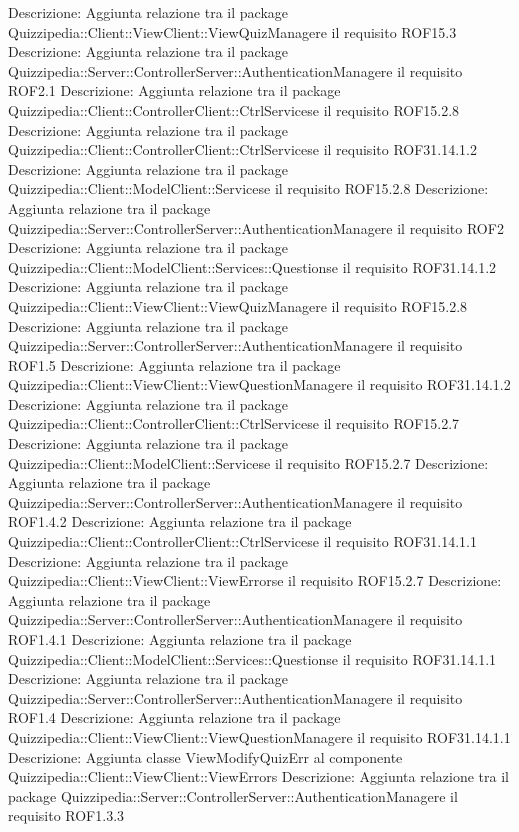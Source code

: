 Descrizione: Aggiunta relazione tra il package Quizzipedia::Client::ViewClient::ViewQuizManagere il requisito ROF15.3 
Descrizione: Aggiunta relazione tra il package Quizzipedia::Server::ControllerServer::AuthenticationManagere il requisito ROF2.1 
Descrizione: Aggiunta relazione tra il package Quizzipedia::Client::ControllerClient::CtrlServicese il requisito ROF15.2.8 
Descrizione: Aggiunta relazione tra il package Quizzipedia::Client::ControllerClient::CtrlServicese il requisito ROF31.14.1.2 
Descrizione: Aggiunta relazione tra il package Quizzipedia::Client::ModelClient::Servicese il requisito ROF15.2.8 
Descrizione: Aggiunta relazione tra il package Quizzipedia::Server::ControllerServer::AuthenticationManagere il requisito ROF2 
Descrizione: Aggiunta relazione tra il package Quizzipedia::Client::ModelClient::Services::Questionse il requisito ROF31.14.1.2 
Descrizione: Aggiunta relazione tra il package Quizzipedia::Client::ViewClient::ViewQuizManagere il requisito ROF15.2.8 
Descrizione: Aggiunta relazione tra il package Quizzipedia::Server::ControllerServer::AuthenticationManagere il requisito ROF1.5 
Descrizione: Aggiunta relazione tra il package Quizzipedia::Client::ViewClient::ViewQuestionManagere il requisito ROF31.14.1.2 
Descrizione: Aggiunta relazione tra il package Quizzipedia::Client::ControllerClient::CtrlServicese il requisito ROF15.2.7 
Descrizione: Aggiunta relazione tra il package Quizzipedia::Client::ModelClient::Servicese il requisito ROF15.2.7 
Descrizione: Aggiunta relazione tra il package Quizzipedia::Server::ControllerServer::AuthenticationManagere il requisito ROF1.4.2 
Descrizione: Aggiunta relazione tra il package Quizzipedia::Client::ControllerClient::CtrlServicese il requisito ROF31.14.1.1 
Descrizione: Aggiunta relazione tra il package Quizzipedia::Client::ViewClient::ViewErrorse il requisito ROF15.2.7 
Descrizione: Aggiunta relazione tra il package Quizzipedia::Server::ControllerServer::AuthenticationManagere il requisito ROF1.4.1 
Descrizione: Aggiunta relazione tra il package Quizzipedia::Client::ModelClient::Services::Questionse il requisito ROF31.14.1.1 
Descrizione: Aggiunta relazione tra il package Quizzipedia::Server::ControllerServer::AuthenticationManagere il requisito ROF1.4 
Descrizione: Aggiunta relazione tra il package Quizzipedia::Client::ViewClient::ViewQuestionManagere il requisito ROF31.14.1.1 
Descrizione: Aggiunta classe ViewModifyQuizErr al componente Quizzipedia::Client::ViewClient::ViewErrors 
Descrizione: Aggiunta relazione tra il package Quizzipedia::Server::ControllerServer::AuthenticationManagere il requisito ROF1.3.3 
